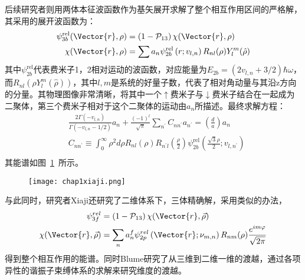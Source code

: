 后续研究者\cite{Xiaji2009prl}则用两体本征波函数作为基矢展开求解了整个相互作用区间的严格解，其采用的展开波函数为：
\begin{equation}
\begin{split}
\psi_{3 b}^{\mathrm{rel}}(\Vector{r}, \rho)&=\left(1-\mathcal{P}_{13}\right) \chi(\Vector{r}, \rho)\\
\chi(\Vector{r}, \rho)&=\sum a_{n} \psi_{2 b}^{\mathrm{rel}}\left(r ; v_{l, n}\right) R_{n l}(\rho) Y_{l}^{m}(\hat{\rho})\\
\end{split}
\end{equation}
其中$\psi_{2 b}^{\mathrm{rel}}$代表费米子1，2相对运动的波函数，对应能量为$E_{2b}=(2v_{l,n}+3/2)\hbar\omega$，而$R_{nl}(\rho Y^m_l(\hat{\rho}))$，其中$l,m$是系统的好量子数，代表了相对角动量与其沿z方向的分量。其物理图像非常清晰，将其中一个$\uparrow$费米子与$\downarrow$费米子结合在一起成为二聚体，第三个费米子相对于这个二聚体的运动由$a_n$所描述。最终求解方程：
\begin{equation}
\begin{split}
&\frac{2 \Gamma\left(-v_{l, n}\right)}{\Gamma\left(-v_{l, n}-1 / 2\right)} a_{n}+\frac{(-1)^{l}}{\sqrt{\pi}} \sum_{n^{\prime}} C_{n n^{\prime}} a_{n^{\prime}}=\left(\frac{d}{a}\right) a_{n}\\
&C_{n n^{\prime}} \equiv \int_{0}^{\infty} \rho^{2} d \rho R_{n l}(\rho) R_{n^{\prime} l}\left(\frac{\rho}{2}\right) \psi_{2 b}^{\mathrm{rel}}\left(\frac{\sqrt{3} \rho}{2} ; v_{l, n^{\prime}}\right)\\
\end{split}
\end{equation}
其能谱如图~\ref{xiaji3d}~所示。
\begin{figure}[!htbp]
    \centering
    \texttt{[image: chap1xiaji.png]}
    \label{xiaji3d}
\end{figure}
与此同时，研究者Xiaji\cite{Xiaji20103b}还研究了二维体系下，三体精确解，采用类似的办法，
\begin{equation}
\begin{split}
\psi_{3 f}^{r e l}&=\left(1-\mathcal{P}_{13}\right) \chi(\Vector{r}, \vec{\rho})\\
\chi(\Vector{r}, \vec{\rho})&=\sum_{n} a_{n}^{f} \psi_{2 p}^{r e l}\left(\Vector{r} ; \nu_{m, n}\right) R_{n m}(\rho) \frac{e^{i m \varphi}}{\sqrt{2 \pi}}\\
\end{split}
\end{equation}
得到整个相互作用的能谱。同时Blume研究了从三维到二维一维的渡越\cite{blume2012}，通过各项异性的谐振子束缚体系的求解来研究维度的渡越。

